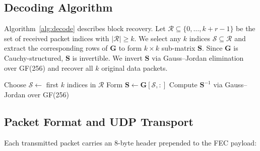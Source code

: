 \documentclass[conference]{IEEEtran}
\begin{document}
\subsection{Decoding Algorithm}

Algorithm~\ref{alg:decode} describes block recovery. Let
$\mathcal{R} \subseteq \{0,\ldots,k{+}r{-}1\}$ be the set of received
packet indices with $|\mathcal{R}| \geq k$. We select any $k$ indices
$\mathcal{S} \subseteq \mathcal{R}$ and extract the corresponding rows of
$\mathbf{G}$ to form $k \times k$ sub-matrix $\mathbf{S}$. Since
$\mathbf{G}$ is Cauchy-structured, $\mathbf{S}$ is invertible. We invert
$\mathbf{S}$ via Gauss--Jordan elimination over GF(256) and recover all
$k$ original data packets.

\begin{algorithm}[!t]
\SetAlgoLined
{}
Choose $\mathcal{S} \leftarrow$ first $k$ indices in $\mathcal{R}$\;
Form $\mathbf{S} \leftarrow \mathbf{G}[\mathcal{S}, :]$
Compute $\mathbf{S}^{-1}$ via Gauss--Jordan over GF(256)\;
\caption{FEC Decoding --- Gauss--Jordan over GF(256)}
\label{alg:decode}
\end{algorithm}

\subsection{Packet Format and UDP Transport}\label{sec:pktformat}

Each transmitted packet carries an 8-byte header prepended to the FEC
payload:

\begin{center}
\end{center}
\end{document}
